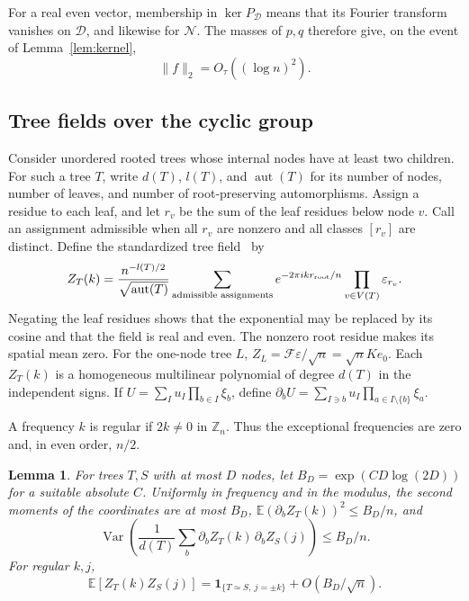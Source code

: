 \documentclass[11pt,letterpaper]{article}
\newtheorem{lemma}{Lemma}[section]
\newcommand{\E}{\mathbb E}
\newcommand{\Z}{\mathbb Z}
\newcommand{\one}{\mathbf 1}
\newcommand{\Var}{\operatorname{Var}}
\newcommand{\aut}{\operatorname{aut}}
\newcommand{\norm}[1]{\lVert #1\rVert}
\begin{document}
For a real even vector, membership in \(\ker P_{\mathcal D}\) means
that its Fourier transform vanishes on \(\mathcal D\), and likewise
for \(\mathcal N\). The masses of \(p,q\) therefore give, on the event
of Lemma~\ref{lem:kernel},
\begin{equation}\label{eq:f-bound}
 \norm f_2=O_\tau((\log n)^2).
\end{equation}

\subsection{Tree fields over the cyclic group}

Consider unordered rooted trees whose internal nodes have at least
two children. For such a tree \(T\), write \(d(T)\), \(l(T)\), and
\(\aut(T)\) for its number of nodes, number of leaves, and number of
root-preserving automorphisms. Assign a residue to each leaf, and
let \(r_v\) be the sum of the leaf residues below node \(v\). Call an
assignment admissible when all \(r_v\) are nonzero and all classes
\([r_v]\) are distinct. Define the standardized tree field~\cite{CHHWY} by
\begin{equation}\label{eq:tree}
 Z_T(k)=\frac{n^{-l(T)/2}}{\sqrt{\aut(T)}}
       \sum_{\text{admissible assignments}}
             e^{-2\pi i k r_{\rm root}/n}\prod_{v\in V(T)}\varepsilon_{r_v}.
\end{equation}
Negating the leaf residues shows that the exponential may be replaced
by its cosine and that the field is real and even. The nonzero root
residue makes its spatial mean zero. For the one-node tree \(L\),
\(Z_L=\mathcal F\varepsilon/\sqrt n=\sqrt n K e_0\). Each \(Z_T(k)\)
is a homogeneous multilinear polynomial of degree \(d(T)\) in the
independent signs. If \(U=\sum_I u_I\prod_{b\in I}\xi_b\), define
\(\partial_b U=\sum_{I\ni b}u_I\prod_{a\in I\setminus\{b\}}\xi_a\).

A frequency \(k\) is regular if \(2k\ne0\) in \(\Z_n\). Thus the
exceptional frequencies are zero and, in even order, \(n/2\).

\begin{lemma}\label{lem:tree-moments}
For trees \(T,S\) with at most \(D\) nodes, let
\(B_D=\exp(CD\log(2D))\) for a suitable absolute \(C\). Uniformly in
frequency and in the modulus, the second moments of the coordinates
are at most \(B_D\), \(\E(\partial_b Z_T(k))^2\le B_D/n\), and
\begin{equation}\label{eq:deriv-var}
 \Var\!\left(\frac{1}{d(T)}\sum_b
           \partial_b Z_T(k)\,\partial_b Z_S(j)\right)\le B_D/n.
\end{equation}
For regular \(k,j\),
\begin{equation}\label{eq:cov}
 \E[Z_T(k)Z_S(j)]=\one_{\{T\simeq S,\ j=\pm k\}}+O(B_D/\sqrt n).
\end{equation}
\end{lemma}
\end{document}
